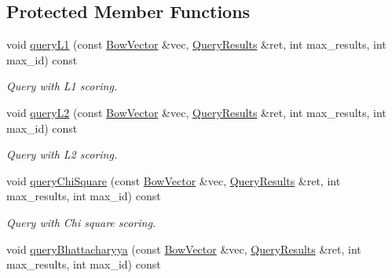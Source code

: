 \subsection*{Protected Member Functions}
\begin{DoxyCompactItemize}
\item 
\mbox{\label{classDBoW2_1_1TemplatedDatabase_a882b65604323fd587bbf9190033356b1}} 
void \hyperlink{classDBoW2_1_1TemplatedDatabase_a882b65604323fd587bbf9190033356b1}{query\+L1} (const \hyperlink{classDBoW2_1_1BowVector}{Bow\+Vector} \&vec, \hyperlink{classDBoW2_1_1QueryResults}{Query\+Results} \&ret, int max\+\_\+results, int max\+\_\+id) const
\begin{DoxyCompactList}\small\item\em Query with L1 scoring. \end{DoxyCompactList}\item 
\mbox{\label{classDBoW2_1_1TemplatedDatabase_a8bbb5131f357461df7fa52c172f23962}} 
void \hyperlink{classDBoW2_1_1TemplatedDatabase_a8bbb5131f357461df7fa52c172f23962}{query\+L2} (const \hyperlink{classDBoW2_1_1BowVector}{Bow\+Vector} \&vec, \hyperlink{classDBoW2_1_1QueryResults}{Query\+Results} \&ret, int max\+\_\+results, int max\+\_\+id) const
\begin{DoxyCompactList}\small\item\em Query with L2 scoring. \end{DoxyCompactList}\item 
\mbox{\label{classDBoW2_1_1TemplatedDatabase_a652506c5bd24baaba138b3b793f96fb5}} 
void \hyperlink{classDBoW2_1_1TemplatedDatabase_a652506c5bd24baaba138b3b793f96fb5}{query\+Chi\+Square} (const \hyperlink{classDBoW2_1_1BowVector}{Bow\+Vector} \&vec, \hyperlink{classDBoW2_1_1QueryResults}{Query\+Results} \&ret, int max\+\_\+results, int max\+\_\+id) const
\begin{DoxyCompactList}\small\item\em Query with Chi square scoring. \end{DoxyCompactList}\item 
\mbox{\label{classDBoW2_1_1TemplatedDatabase_aa5cde1d8e4cc60e544baf2b3028718c3}} 
void \hyperlink{classDBoW2_1_1TemplatedDatabase_aa5cde1d8e4cc60e544baf2b3028718c3}{query\+Bhattacharyya} (const \hyperlink{classDBoW2_1_1BowVector}{Bow\+Vector} \&vec, \hyperlink{classDBoW2_1_1QueryResults}{Query\+Results} \&ret, int max\+\_\+results, int max\+\_\+id) const

\end{DoxyCompactItemize}
